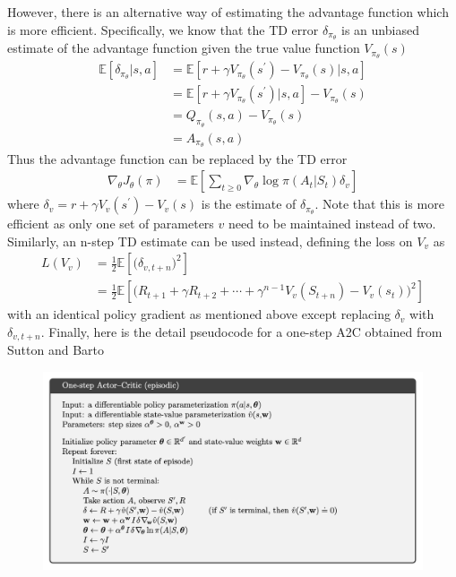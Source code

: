 \documentclass[12pt]{report}
\begin{document}
However, there is an alternative way of estimating the advantage function which is more efficient. Specifically, we know that the TD error $\delta_{\pi_\theta}$ is an unbiased estimate \cite{silver2015} of the advantage function given the true value function $V_{\pi_\theta}(s)$
\begin{align}
    \mathbb{E}[\delta_{\pi_\theta}|s,a] &= \mathbb{E}[r + \gamma V_{\pi_\theta}(s^\prime) - V_{\pi_\theta}(s)|s,a] \nonumber\\
    &= \mathbb{E}[r + \gamma V_{\pi_\theta}(s^\prime)|s,a] - V_{\pi_\theta}(s) \nonumber\\
    &= Q_{\pi_\theta}(s,a) - V_{\pi_\theta}(s)\nonumber\\
    &= A_{\pi_\theta}(s,a) \nonumber
\end{align}
Thus the advantage function can be replaced by the TD error
\begin{align}
    \nabla_\theta J_\theta(\pi) &= \mathbb{E}\left[\sum_{t\ge0} \nabla_\theta \log \pi(A_t|S_t) \delta_v\right] \label{eq:A2C-policy-grad}
\end{align}
where $\delta_v = r + \gamma V_v(s^\prime) - V_v(s)$ is the estimate of $\delta_{\pi_\theta}$. Note that this is more efficient as only one set of parameters $v$ need to be maintained instead of two. Similarly, an n-step TD estimate can be used instead, defining the loss on $V_v$ as
\begin{align}
    L(V_v) &= \frac{1}{2}\mathbb{E}\left[\Big(\delta_{v,t+n}\Big)^2\right]\\
    &= \frac{1}{2}\mathbb{E}\left[\Big(R_{t+1}+ \gamma R_{t+2} + \cdots + \gamma^{n-1}V_v(S_{t+n})-V_v(s_t)\Big)^2\right]
\end{align}
with an identical policy gradient as mentioned above except replacing $\delta_v$ with $\delta_{v,t+n}$. Finally, here is the detail pseudocode for a one-step A2C obtained from Sutton and Barto \cite{sutton2018reinforcement}
\begin{figure}[H]
    \center
    \includegraphics[width=1\linewidth]{figs/A2C.png}
    \label{fig:A2C}
\end{figure}
\end{document}
